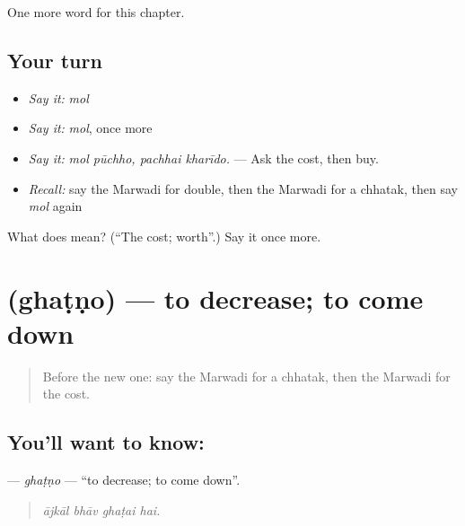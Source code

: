 \begin{grammarlens}[title={What you've built}]
One more word for this chapter.
\end{grammarlens}

\subsection*{Your turn}
\begin{itemize}
\raggedright
  \item \emph{Say it:} \emph{mol}
  \item \emph{Say it:} \emph{mol}, once more
  \item \emph{Say it:} \emph{mol pūchho, pachhai kharīdo.} — Ask the cost, then buy.
  \item \emph{Recall:} say the Marwadi for double, then the Marwadi for a chhatak, then say \emph{mol} again
\end{itemize}

\begin{tcolorbox}[breakable,colback=teal!4,colframe=teal!35!black,title={Before you move on}]
What does  mean? (\textquotedblleft{}The cost; worth\textquotedblright{}.) Say it once more.
\end{tcolorbox}
\section[\texorpdfstring{\mw{घटणो} (ghaṭṇo)}{घटणो (ghaṭṇo)}]{ (ghaṭṇo) — to decrease; to come down}

\label{lesson:MW-C213-ghatno}



\begin{quote}
Before the new one: say the Marwadi for a chhatak, then the Marwadi for the cost.
\end{quote}

\subsection*{You'll want to know: }
\textbf{} — \emph{ghaṭṇo} — \textquotedblleft{}to decrease; to come down\textquotedblright{}.

\begin{quote}
   
\end{quote}

\begin{quote}
\emph{ājkāl bhāv ghaṭai hai.}
\end{quote}

